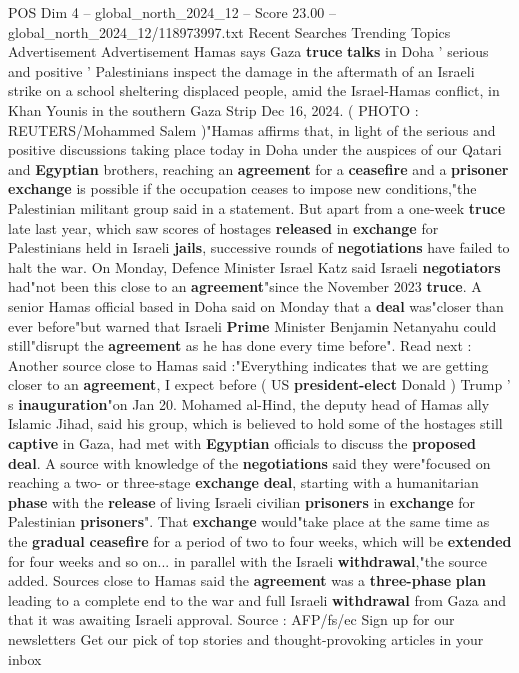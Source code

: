 \begin{textsample}{POS Dim 4 – global\_north\_2024\_12 – Score 23.00 – global\_north\_2024\_12/118973997.txt}  \label{ex:f4_pos_326}
Recent Searches Trending Topics Advertisement Advertisement Hamas says Gaza \textbf{truce} \textbf{talks} in Doha ' serious and positive ' Palestinians inspect the damage in the aftermath of an Israeli strike on a school sheltering displaced people, amid the Israel-Hamas conflict, in Khan Younis in the southern Gaza Strip Dec 16, 2024. ( PHOTO : REUTERS/Mohammed Salem )"Hamas affirms that, in light of the serious and positive discussions taking place today in Doha under the auspices of our Qatari and \textbf{Egyptian} brothers, reaching an \textbf{agreement} for a \textbf{ceasefire} and a \textbf{prisoner} \textbf{exchange} is possible if the occupation ceases to impose new conditions,"the Palestinian militant group said in a statement.
But apart from a one-week \textbf{truce} late last year, which saw scores of hostages \textbf{released} in \textbf{exchange} for Palestinians held in Israeli \textbf{jails}, successive rounds of \textbf{negotiations} have failed to halt the war.
On Monday, Defence Minister Israel Katz said Israeli \textbf{negotiators} had"not been this close to an \textbf{agreement}"since the November 2023 \textbf{truce}.
A senior Hamas official based in Doha said on Monday that a \textbf{deal} was"closer than ever before"but warned that Israeli \textbf{Prime} Minister Benjamin Netanyahu could still"disrupt the \textbf{agreement} as he has done every time before".
Read next : Another source close to Hamas said :"Everything indicates that we are getting closer to an \textbf{agreement}, I expect before ( US \textbf{president-elect} Donald ) Trump ' s \textbf{inauguration}"on Jan 20.
Mohamed al-Hind, the deputy head of Hamas ally Islamic Jihad, said his group, which is believed to hold some of the hostages still \textbf{captive} in Gaza, had met with \textbf{Egyptian} officials to discuss the \textbf{proposed} \textbf{deal}.
A source with knowledge of the \textbf{negotiations} said they were"focused on reaching a two- or three-stage \textbf{exchange} \textbf{deal}, starting with a humanitarian \textbf{phase} with the \textbf{release} of living Israeli civilian \textbf{prisoners} in \textbf{exchange} for Palestinian \textbf{prisoners}".
That \textbf{exchange} would"take place at the same time as the \textbf{gradual} \textbf{ceasefire} for a period of two to four weeks, which will be \textbf{extended} for four weeks and so on... in parallel with the Israeli \textbf{withdrawal},"the source added.
Sources close to Hamas said the \textbf{agreement} was a \textbf{three-phase} \textbf{plan} leading to a complete end to the war and full Israeli \textbf{withdrawal} from Gaza and that it was awaiting Israeli approval.
Source : AFP/fs/ec Sign up for our newsletters Get our pick of top stories and thought-provoking articles in your inbox

\end{textsample}
